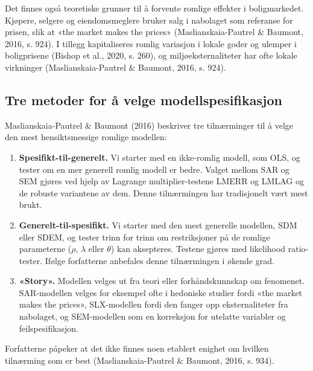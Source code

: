 \documentclass[
  norsk,
  a4paper,
]{article}
\providecommand{\tightlist}{%
  \setlength{\itemsep}{0pt}\setlength{\parskip}{0pt}}
\begin{document}
Det finnes også teoretiske grunner til å forvente romlige effekter i
boligmarkedet. Kjøpere, selgere og eiendomsmeglere bruker salg i
nabolaget som referanse for prisen, slik at «the market makes the
prices» (Maslianskaia-Pautrel \& Baumont, 2016, s. 924). I tillegg
kapitaliseres romlig variasjon i lokale goder og ulemper i boligprisene
(Bishop et al., 2020, s. 260), og miljøeksternaliteter har ofte lokale
virkninger (Maslianskaia-Pautrel \& Baumont, 2016, s. 924).

\subsection{Tre metoder for å velge
modellspesifikasjon}\label{tre-metoder-for-uxe5-velge-modellspesifikasjon}

Maslianskaia-Pautrel \& Baumont (2016) beskriver tre tilnærminger til å
velge den mest hensiktsmessige romlige modellen:

\begin{enumerate}
\def\labelenumi{\arabic{enumi}.}
\tightlist
\item
  \textbf{Spesifikt-til-generelt.} Vi starter med en ikke-romlig modell,
  som OLS, og tester om en mer generell romlig modell er bedre. Valget
  mellom SAR og SEM gjøres ved hjelp av Lagrange multiplier-testene
  LMERR og LMLAG og de robuste variantene av dem. Denne tilnærmingen har
  tradisjonelt vært mest brukt.
\item
  \textbf{Generelt-til-spesifikt.} Vi starter med den mest generelle
  modellen, SDM eller SDEM, og tester trinn for trinn om restriksjoner
  på de romlige parameterne (\(\rho\), \(\lambda\) eller \(\theta\)) kan
  aksepteres. Testene gjøres med likelihood ratio-tester. Ifølge
  forfatterne anbefales denne tilnærmingen i økende grad.
\item
  \textbf{«Story».} Modellen velges ut fra teori eller forhåndskunnskap
  om fenomenet. SAR-modellen velges for eksempel ofte i hedoniske
  studier fordi «the market makes the prices», SLX-modellen fordi den
  fanger opp eksternaliteter fra nabolaget, og SEM-modellen som en
  korreksjon for utelatte variabler og feilspesifikasjon.
\end{enumerate}

Forfatterne påpeker at det ikke finnes noen etablert enighet om hvilken
tilnærming som er best (Maslianskaia-Pautrel \& Baumont, 2016, s. 934).
\end{document}
